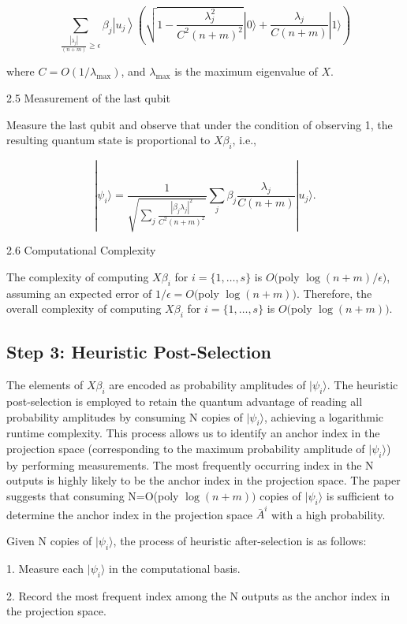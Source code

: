 \documentclass[12pt]{article}
\begin{document}
$$
\sum_{\frac{\left|\lambda_{j}\right|}{(n+m)} \geq \epsilon} \beta_{j}\left|u_{j}\right\rangle \left(\sqrt{1-\frac{\lambda_{j}^{2}}{C^{2}(n+m)^{2}}}|0\rangle +\frac{\lambda_{j}}{C(n+m)}|1\rangle\right)
$$

where $C=O\left(1 / \lambda_{\max }\right)$, and $\lambda_{\max }$ is the maximum eigenvalue of $X$.

2.5 Measurement of the last qubit

Measure the last qubit and observe that under the condition of observing 1, the resulting quantum state is proportional to $X\beta_{i}$, i.e.,

$$
|\psi_{i}\rangle=\frac{1}{\sqrt{\sum_{j} \frac{|\beta_{j} \lambda_{j}|^{2}}{C^{2}(n+m)^{2}}}} \sum_{j} \beta_{j} \frac{\lambda_{j}}{C(n+m)}|u_{j}\rangle .
$$

2.6 Computational Complexity

The complexity of computing $X\beta_{i}$ for $i=\{1, \ldots, s\}$ is $O($poly $\log (n+m) / \epsilon)$, assuming an expected error of $1 / \epsilon=O($poly $\log (n+m))$. Therefore, the overall complexity of computing $X\beta_{i}$ for $i=\{1, \ldots, s\}$ is $O($poly $\log (n+m))$.

\subsection{Step 3: Heuristic Post-Selection}

The elements of $X\beta_{i}$ are encoded as probability amplitudes of $|\psi_{i}\rangle$. The heuristic post-selection is employed to retain the quantum advantage of reading all probability amplitudes by consuming N copies of $|\psi_{i}\rangle$, achieving a logarithmic runtime complexity. This process allows us to identify an anchor index in the projection space (corresponding to the maximum probability amplitude of $|\psi_{i}\rangle$) by performing measurements. The most frequently occurring index in the N outputs is highly likely to be the anchor index in the projection space. The paper suggests that consuming N=O(poly $\log (n+m))$ copies of $|\psi_{i}\rangle$ is sufficient to determine the anchor index in the projection space $\bar{A}^{i}$ with a high probability.

Given N copies of $|\psi_{i}\rangle$, the process of heuristic after-selection is as follows:

1. Measure each $|\psi_{i}\rangle$ in the computational basis.

2. Record the most frequent index among the N outputs as the anchor index in the projection space.
\end{document}
